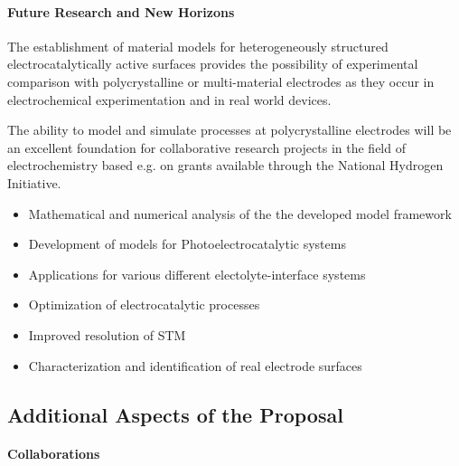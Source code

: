 \documentclass[a4paper,10pt]{article}
\begin{document}
\paragraph{Future Research and New Horizons}
The establishment of material models for heterogeneously structured electrocatalytically active surfaces
provides the possibility of experimental comparison with polycrystalline or  multi-material electrodes
as they occur in electrochemical experimentation and in real world devices.

The ability to model and simulate processes at polycrystalline electrodes will be an excellent foundation
for collaborative research projects in the field of electrochemistry based e.g. on grants available through
the National Hydrogen Initiative.

\begin{itemize}
\item Mathematical and numerical  analysis  of the the developed model framework
\item Development of models for Photoelectrocatalytic systems
\item Applications for various different electolyte-interface systems
\item Optimization of electrocatalytic processes
\item Improved resolution of STM
\item Characterization and identification of real electrode surfaces
\end{itemize}





\subsection*{Additional Aspects of the Proposal}

\paragraph{Collaborations}
\end{document}
